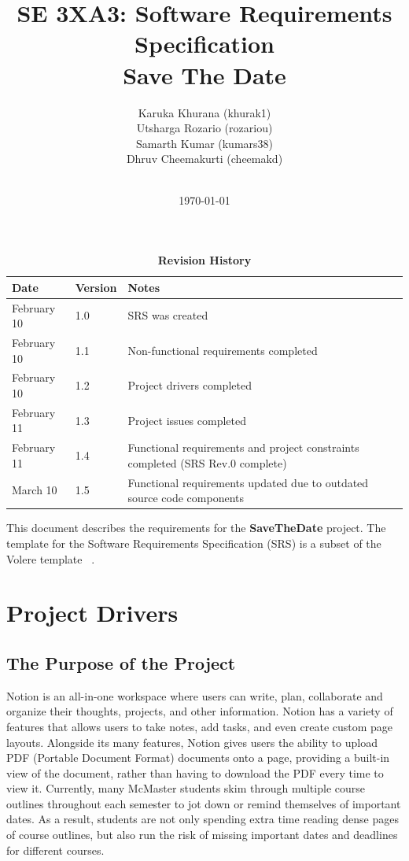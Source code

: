 \documentclass[12pt, titlepage]{article}
\title{SE 3XA3: Software Requirements Specification\\Save The Date}
\author{
        Karuka Khurana (khurak1)\\
        Utsharga Rozario (rozariou)\\
        Samarth Kumar (kumars38)\\
        Dhruv Cheemakurti (cheemakd)\\
        \\
}
\date{\today}
\begin{document}
\maketitle

\tableofcontents
\listoftables
\listoffigures

\newpage

\begin{table}[p]
\caption{\bf Revision History}
\begin{tabularx}{\textwidth}{p{3cm}p{2cm}X}
\toprule {\bf Date} & {\bf Version} & {\bf Notes}\\
\midrule
February 10 & 1.0 & SRS was created\\
February 10 & 1.1 & Non-functional requirements completed\\
February 10 & 1.2 & Project drivers completed\\
February 11 & 1.3 & Project issues completed\\
February 11 & 1.4 & Functional requirements and project constraints completed (SRS Rev.0 complete)\\
March 10 & 1.5 & Functional requirements updated due to outdated source code components\\
\bottomrule
\end{tabularx}
\end{table}

\clearpage


\newpage

This document describes the requirements for the \textbf{SaveTheDate} project. 
The template for the Software Requirements Specification (SRS) is a subset of the Volere
template ~\citep{RobertsonAndRobertson2012}.

\section{Project Drivers}

\subsection{The Purpose of the Project}
Notion is an all-in-one workspace where users can write, plan, collaborate and organize their thoughts, projects, and other information. Notion has a variety of features that allows users to take notes, add tasks, and even create custom page layouts. Alongside its many features, Notion gives users the ability to upload PDF (Portable Document Format) documents onto a page, providing a built-in view of the document, rather than having to download the PDF every time to view it. Currently, many McMaster students skim through multiple course outlines throughout each semester to jot down or remind themselves of important dates. As a result, students are not only spending extra time reading dense pages of course outlines, but also run the risk of missing important dates and deadlines for different courses.  
\end{document}
